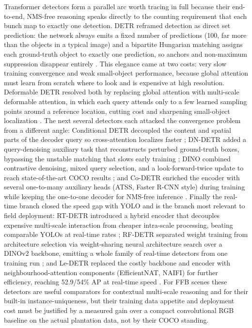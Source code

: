 Transformer detectors form a parallel arc worth tracing in full because their end-to-end, NMS-free reasoning speaks directly to the counting requirement that each bunch map to exactly one detection. DETR reframed detection as direct set prediction: the network always emits a fixed number of predictions (100, far more than the objects in a typical image) and a bipartite Hungarian matching assigns each ground-truth object to exactly one prediction, so anchors and non-maximum suppression disappear entirely \cite{carion2020detr}. This elegance came at two costs: very slow training convergence and weak small-object performance, because global attention must learn from scratch where to look and is expensive at high resolution. Deformable DETR resolved both by replacing global attention with multi-scale deformable attention, in which each query attends only to a few learned sampling points around a reference location, cutting cost and sharpening small-object localization \cite{zhu2021deformabledetr}. The next several detectors each attacked the convergence problem from a different angle: Conditional DETR decoupled the content and spatial parts of the decoder query so cross-attention localizes faster \cite{meng2021conditionaldetr}; DN-DETR added a query-denoising auxiliary task that reconstructs perturbed ground-truth boxes, bypassing the unstable matching that slows early training \cite{li2022dndetr}; DINO combined contrastive denoising, mixed query selection, and a look-forward-twice update to reach state-of-the-art COCO results \cite{zhang2023dino}; and Co-DETR enriched the encoder with several one-to-many auxiliary heads (ATSS, Faster R-CNN style) during training while keeping the one-to-one decoder for NMS-free inference \cite{zong2023codetr}. Finally the real-time branch closed the speed gap with YOLO and is the branch most relevant to field deployment: RT-DETR introduced a hybrid encoder that decouples expensive multi-scale interaction from cheaper intra-scale processing, beating comparable YOLOs at real-time rates \cite{zhao2024rtdetr}; RF-DETR separated weight training from architecture selection via weight-sharing neural architecture search over a DINOv2 backbone, emitting a whole family of real-time detectors from one training run \cite{robinson2025rfdetr}; and Le-DETR replaced the costly backbone and encoder with neighbourhood-attention components (EfficientNAT, NAIFI) for further efficiency, reaching 52.9/54\% AP at real-time speed \cite{huang2026ledetr}. For FFB scenes these detectors are useful comparators for contextual multi-scale reasoning and for their built-in instance-uniqueness, but their training data appetite and deployment cost must be justified by a measured gain over a compact convolutional RGB baseline on the actual plantation data, not by their COCO standing.

